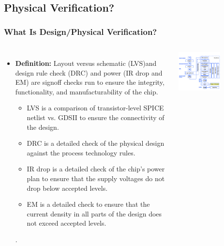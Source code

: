 \documentclass[compress]{beamer}
\begin{document}
\subsection[PVR]{Physical Verification?}
\begin{frame}
	\frametitle{What Is Design/Physical Verification?}
	\begin{columns}
		\begin{itemize}
			\item \textbf {Definition:} Layout versus schematic (LVS)and design rule check (DRC) and power (IR drop and EM) are signoff checks run to ensure the integrity, functionality, and manufacturability of the chip.
			\begin{itemize}
				\item LVS is a comparison of transistor-level SPICE netlist vs. GDSII to ensure the connectivity of the design.
				\item DRC is a detailed check of the physical design against the process technology rules.
				\item IR drop is a detailed check of the chip’s power plan to ensure that the supply voltages do not drop below accepted levels.
				\item  EM is a detailed check to ensure that the current density in all parts of the design does not exceed accepted levels.
			\end{itemize}.
		\end{itemize}
		\begin{center}
			\includegraphics[width=0.6\textwidth]{PVR}
		\end{center}
	\end{columns}
\end{frame}
\end{document}
